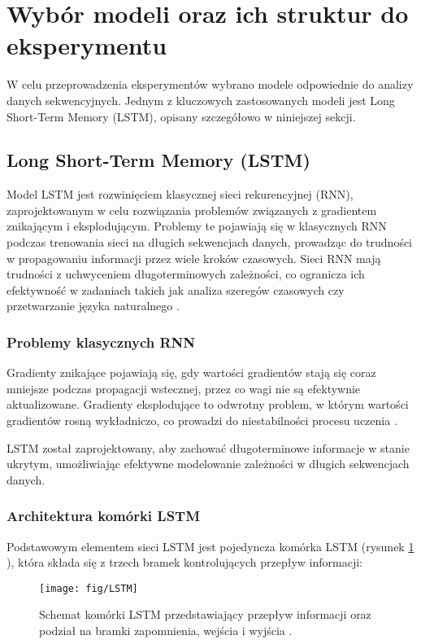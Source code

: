 \documentclass[eeg_v4.tex]{subfiles}
\begin{document}
    \section{Wybór modeli oraz ich struktur do eksperymentu}
    W celu przeprowadzenia eksperymentów wybrano modele odpowiednie do analizy danych sekwencyjnych. Jednym z kluczowych
    zastosowanych modeli jest Long Short-Term Memory (LSTM), opisany szczegółowo w niniejszej sekcji.

    \subsection{Long Short-Term Memory (LSTM)}
    Model LSTM jest rozwinięciem klasycznej sieci rekurencyjnej (RNN), zaprojektowanym w celu rozwiązania problemów
    związanych z gradientem znikającym i eksplodującym. Problemy te pojawiają się w klasycznych RNN podczas trenowania
    sieci na długich sekwencjach danych, prowadząc do trudności w propagowaniu informacji przez wiele kroków czasowych.
    Sieci RNN mają trudności z uchwyceniem długoterminowych zależności, co ogranicza ich efektywność w zadaniach takich
    jak analiza szeregów czasowych czy przetwarzanie języka naturalnego \cite{hochreiter1997}.

    \subsubsection{Problemy klasycznych RNN}
    Gradienty znikające pojawiają się, gdy wartości gradientów stają się coraz mniejsze podczas propagacji wstecznej,
    przez co wagi nie są efektywnie aktualizowane. Gradienty eksplodujące to odwrotny problem, w którym wartości
    gradientów rosną wykładniczo, co prowadzi do niestabilności procesu uczenia \cite{sherstinsky2020}.

    LSTM został zaprojektowany, aby zachować długoterminowe informacje w stanie ukrytym, umożliwiając efektywne
    modelowanie zależności w długich sekwencjach danych.

    \subsubsection{Architektura komórki LSTM}

    Podstawowym elementem sieci LSTM jest pojedyncza komórka LSTM (rysunek \ref{fig:lstm_cell}
    ), która składa się z trzech bramek kontrolujących przepływ informacji:

    \begin{figure}[h!]
        \centering
        \texttt{[image: fig/LSTM]}
        \caption{Schemat komórki LSTM przedstawiający przepływ informacji oraz podział na bramki zapomnienia,
            wejścia i wyjścia \cite{chen2024}.}
        \label{fig:lstm_cell}
    \end{figure}
\end{document}
